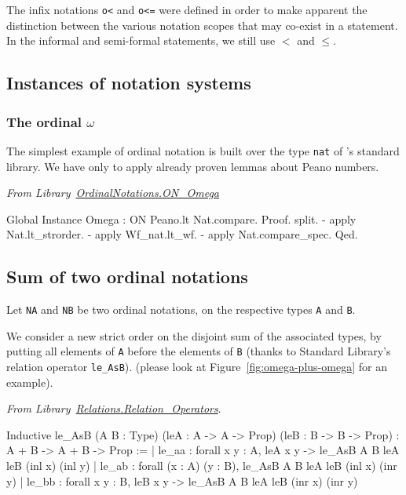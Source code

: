 \begin{remark}
The infix notations \texttt{o<} and \texttt{o<=} were defined in order to make apparent the distinction between the various notation scopes that may co-exist in a statement. In the informal and semi-formal statements, we still use $<$ and $\leq$.
\end{remark}

\subsection{Instances of notation systems}


\subsubsection{The ordinal \texorpdfstring{$\omega$}{omega}}

The simplest example of ordinal notation is built over the type \texttt{nat} of \coq's standard library. We have only to apply already proven lemmas about Peano numbers.

\vspace{4pt}
\noindent\emph{From Library~\href{../src/html/hydras.OrdinalNotations/ON_Omega.html}{OrdinalNotations.ON\_Omega}}


\begin{Coqsrc}
Global Instance Omega : ON  Peano.lt Nat.compare.
Proof.
 split.
 - apply Nat.lt_strorder.
 - apply Wf_nat.lt_wf.
 - apply Nat.compare_spec.
Qed.
\end{Coqsrc}


\subsection{Sum of two ordinal notations}

Let \texttt{NA} and \texttt{NB} be two ordinal notations, on the respective types \texttt{A} and \texttt{B}.

 We consider a new strict order
on the disjoint sum of the associated types, by putting all elements of \texttt{A} before the elements of \texttt{B} (thanks to Standard Library's relation operator \texttt{le\_AsB}).
(please look at Figure~\ref{fig:omega-plus-omega} for an example).


\emph{From Library~\href{https://coq.inria.fr/distrib/current/stdlib/Coq.Relations.Relation_Operators.html}{Relations.Relation\_Operators}}.

\begin{Coqanswer}
Inductive
le_AsB (A B : Type) (leA : A -> A -> Prop) (leB : B -> B -> Prop)
  : A + B -> A + B -> Prop :=
| le_aa : forall x y : A, leA x y -> le_AsB A B leA leB (inl x) (inl y)
| le_ab : forall (x : A) (y : B), le_AsB A B leA leB (inl x) (inr y)
| le_bb : forall x y : B, leB x y -> le_AsB A B leA leB (inr x) (inr y)
\end{Coqanswer}


